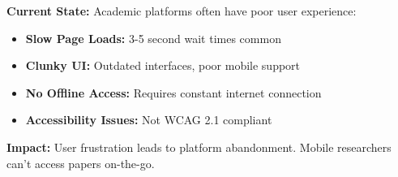 \begin{warningbox}
\textbf{Current State:} Academic platforms often have poor user experience:
\begin{itemize}
    \item \textbf{Slow Page Loads:} 3-5 second wait times common
    \item \textbf{Clunky UI:} Outdated interfaces, poor mobile support
    \item \textbf{No Offline Access:} Requires constant internet connection
    \item \textbf{Accessibility Issues:} Not WCAG 2.1 compliant
\end{itemize}

\textbf{Impact:} User frustration leads to platform abandonment. Mobile researchers can't access papers on-the-go.
\end{warningbox}

